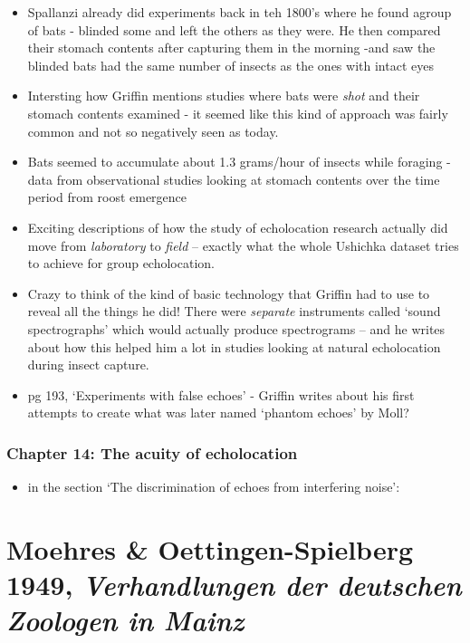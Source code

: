 \documentclass[
]{book}
\providecommand{\tightlist}{%
  \setlength{\itemsep}{0pt}\setlength{\parskip}{0pt}}
\begin{document}
\begin{itemize}
\item
  Spallanzi already did experiments back in teh 1800's where he found agroup of bats - blinded some and left the others as they were. He then compared their stomach contents after capturing them in the morning -and saw the blinded bats had the same number of insects as the ones with intact eyes
\item
  Intersting how Griffin mentions studies where bats were \emph{shot} and their stomach contents examined - it seemed like this kind of approach was fairly common and not so negatively seen as today.
\item
  Bats seemed to accumulate about 1.3 grams/hour of insects while foraging - data from observational studies looking at stomach contents over the time period from roost emergence
\item
  Exciting descriptions of how the study of echolocation research actually did move from \emph{laboratory} to \emph{field} -- exactly what the whole Ushichka dataset tries to achieve for group echolocation.
\item
  Crazy to think of the kind of basic technology that Griffin had to use to reveal all the things he did! There were \emph{separate} instruments called `sound spectrographs' which would actually produce spectrograms -- and he writes about how this helped him a lot in studies looking at natural echolocation during insect capture.
\item
  pg 193, `Experiments with false echoes' - Griffin writes about his first attempts to create what was later named `phantom echoes' by Moll?
\end{itemize}

\hypertarget{chapter-14-the-acuity-of-echolocation}{%
\subsection{Chapter 14: The acuity of echolocation}\label{chapter-14-the-acuity-of-echolocation}}

\begin{itemize}
\tightlist
\item
  in the section `The discrimination of echoes from interfering noise':
\end{itemize}

\hypertarget{moehres-oettingen-spielberg-1949-verhandlungen-der-deutschen-zoologen-in-mainz}{%
\chapter{\texorpdfstring{Moehres \& Oettingen-Spielberg 1949, \emph{Verhandlungen der deutschen Zoologen in Mainz}}{Moehres \& Oettingen-Spielberg 1949, Verhandlungen der deutschen Zoologen in Mainz}}\label{moehres-oettingen-spielberg-1949-verhandlungen-der-deutschen-zoologen-in-mainz}}
\end{document}
